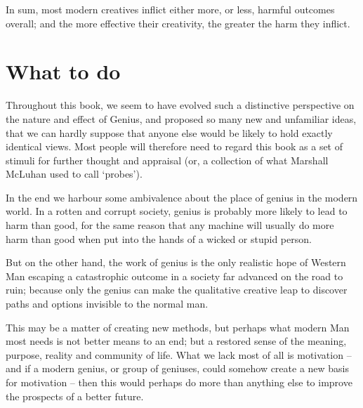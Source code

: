 \documentclass[
]{book}
\begin{document}
In sum, most modern creatives inflict either more, or less, harmful outcomes overall; and the more effective their creativity, the greater the harm they inflict.

\hypertarget{what-to-do}{%
\chapter{What to do}\label{what-to-do}}

Throughout this book, we seem to have evolved such a distinctive perspective on the nature and effect of Genius, and proposed so many new and unfamiliar ideas, that we can hardly suppose that anyone else would be likely to hold exactly identical views. Most people will therefore need to regard this book as a set of stimuli for further thought and appraisal (or, a collection of what Marshall McLuhan used to call `probes').

In the end we harbour some ambivalence about the place of genius in the modern world. In a rotten and corrupt society, genius is probably more likely to lead to harm than good, for the same reason that any machine will usually do more harm than good when put into the hands of a wicked or stupid person.

But on the other hand, the work of genius is the only realistic hope of Western Man escaping a catastrophic outcome in a society far advanced on the road to ruin; because only the genius can make the qualitative creative leap to discover paths and options invisible to the normal man.

This may be a matter of creating new methods, but perhaps what modern Man most needs is not better means to an end; but a restored sense of the meaning, purpose, reality and community of life. What we lack most of all is motivation -- and if a modern genius, or group of geniuses, could somehow create a new basis for motivation -- then this would perhaps do more than anything else to improve the prospects of a better future.
\end{document}
